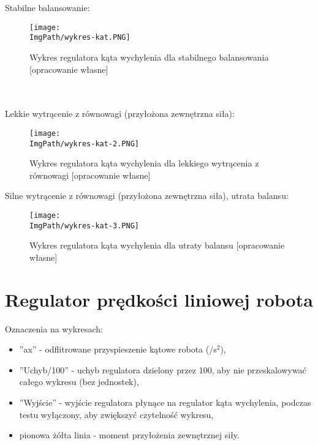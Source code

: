 \documentclass[a4paper,12pt,twoside,openany]{report}
\newcommand{\ImgPath}{.}
\begin{document}
\newpage
\noindent Stabilne balansowanie:
\begin{figure}[!htbp]
	\begin{center}
\centering
\texttt{[image: \\ImgPath/wykres-kat.PNG]}
\end{center}
	\caption{Wykres regulatora kąta wychylenia dla stabilnego balansowania [opracowanie własne]}
	\label{schematKomunikacji}
\end{figure}
\\
\\
\noindent Lekkie wytrącenie z równowagi (przyłożona zewnętrzna siła):
\begin{figure}[!htbp]
	\begin{center}
\centering
\texttt{[image: \\ImgPath/wykres-kat-2.PNG]}
\end{center}
	\caption{Wykres regulatora kąta wychylenia dla lekkiego wytrącenia z równowagi [opracowanie własne]}
	\label{schematKomunikacji}
\end{figure}

\newpage
\noindent Silne wytrącenie z równowagi (przyłożona zewnętrzna siła), utrata balansu:
\begin{figure}[!htbp]
	\begin{center}
\centering
\texttt{[image: \\ImgPath/wykres-kat-3.PNG]}
\end{center}
	\caption{Wykres regulatora kąta wychylenia dla utraty balansu [opracowanie własne]}
	\label{schematKomunikacji}
\end{figure}

\section{Regulator prędkości liniowej robota}

\noindent Oznaczenia na wykresach:
\begin{itemize}
\item ''ax'' - odflitrowane przyspieszenie kątowe robota (\textdegree/s$^2$),
\item ''Uchyb/100'' - uchyb regulatora dzielony przez 100, aby nie przeskalowywać całego wykresu (bez jednostek),
\item ''Wyjście'' - wyjście regulatora płynące na regulator kąta wychylenia, podczas testu wyłączony, aby zwiększyć czytelność wykresu,
\item pionowa żółta linia - moment przyłożenia zewnętrznej siły.
\end{itemize}
\end{document}
